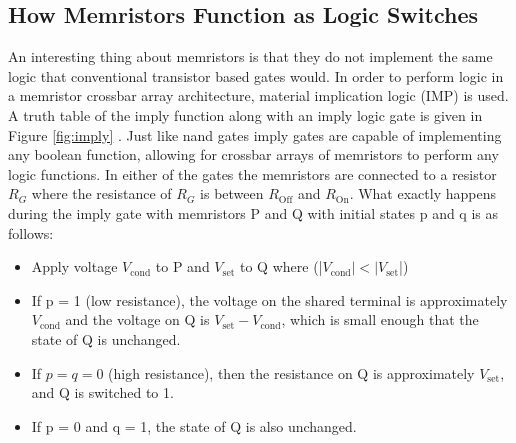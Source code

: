 \documentclass{sig-alternate}
\begin{document}
\subsection{How Memristors Function as Logic Switches}



An interesting thing about memristors is that they do not implement the same logic that conventional transistor based gates would.  In order to perform logic in a memristor crossbar array architecture, material implication logic (IMP) is used.  A truth table of the imply function along with an imply logic gate is given in Figure \ref{fig:imply} \cite{kvatinsky2014memristorbased}.  Just like nand gates imply gates are capable of implementing any boolean function, allowing for crossbar arrays of memristors to perform any logic functions.  In either of the gates the memristors are connected to a resistor $R_{G}$ where the resistance of $R_{G}$ is between $R_{\textrm{Off}}$ and $R_{\textrm{On}}$. What exactly happens during the imply gate with memristors P and Q with initial states p and q is as follows:

\begin{itemize}
\item Apply voltage $V_{\textrm{cond}}$ to P and $V_{\textrm{set}}$ to Q 
where (|$V_{\textrm{cond}}| < |V_{\textrm{set}}$|)
\item If p = 1 (low resistance), the voltage on the shared terminal is approximately $V_{\textrm{cond}}$ and the voltage on Q is $V_{\textrm{set}} - V_{\textrm{cond}}$, which is small enough that the state of Q is unchanged.
\item If $p = q = 0$ (high resistance), then the resistance on Q is approximately  $V_{\textrm{set}}$, and Q is switched to 1.
\item If p = 0 and q = 1, the state of Q is also unchanged.
\end{itemize}

\end{document}
